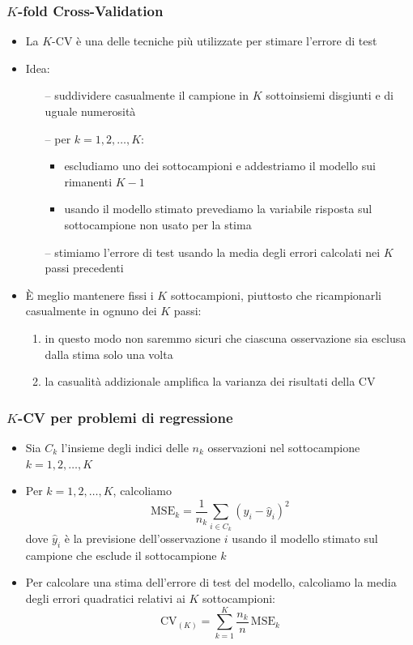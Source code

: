 \begin{frame}
	\frametitle{$K$-fold Cross-Validation}
	\begin{itemize}
		\item La $K$-CV è una delle tecniche più utilizzate per stimare l'errore di test
		\item Idea:
		\begin{itemize}
			\item[--] suddividere casualmente il campione in $K$ sottoinsiemi disgiunti e di uguale numerosità
			\item[--] per $k=1,2,\ldots,K$:
				\begin{itemize}
					\item escludiamo uno dei sottocampioni e addestriamo il modello sui rimanenti $K-1$
					\item usando il modello stimato prevediamo la variabile risposta sul sottocampione non usato per la stima
				\end{itemize}
			\item[--] stimiamo l'errore di test usando la media degli errori calcolati nei $K$ passi precedenti
		\end{itemize}

		\item È meglio mantenere fissi i $K$ sottocampioni, piuttosto che ricampionarli casualmente in ognuno dei $K$ passi:
		\begin{enumerate}
			\item in questo modo non saremmo sicuri che ciascuna osservazione sia esclusa dalla stima solo una volta
			\item la casualità addizionale amplifica la varianza dei risultati della CV
		\end{enumerate}
	\end{itemize}
\end{frame}


\begin{frame}
	\frametitle{$K$-CV per problemi di regressione}
	\begin{itemize}
		\item Sia $C_k$ l'insieme degli indici delle $n_k$ osservazioni nel sottocampione $k=1,2,\ldots,K$

		\item Per $k=1,2,\ldots,K$, calcoliamo
		\[
		\mbox{MSE}_k = \frac{1}{n_k}\sum_{i\in C_k} (y_i-\hat y_i)^2
		\]
		dove $\hat y_i$ è la previsione dell'osservazione $i$ usando il modello stimato sul campione che esclude il sottocampione $k$

		\item Per calcolare una stima dell'errore di test del modello, calcoliamo la media degli errori quadratici relativi ai $K$ sottocampioni:
		\[
		\mbox{CV}_{(K)} = \sum_{k=1}^K \frac{n_k}{n}\,\mbox{MSE}_k
		\]
	\end{itemize}
\end{frame}


